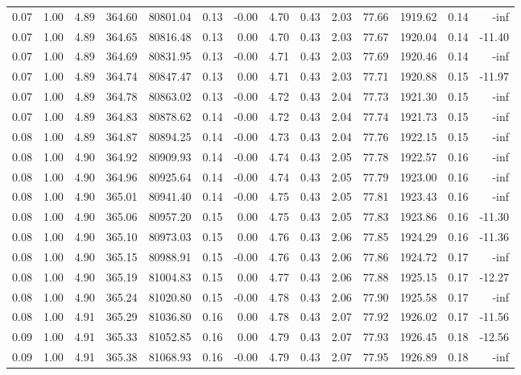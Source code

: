 \begin{table}[!ht]
\begin{tabular}{rrrrrrrrrrrrrr}
0.07 & 1.00 & 4.89 & 364.60 & 80801.04 & 0.13 & -0.00 & 4.70 & 0.43 & 2.03 & 77.66 & 1919.62 & 0.14 & -inf \\
0.07 & 1.00 & 4.89 & 364.65 & 80816.48 & 0.13 & 0.00 & 4.70 & 0.43 & 2.03 & 77.67 & 1920.04 & 0.14 & -11.40 \\
0.07 & 1.00 & 4.89 & 364.69 & 80831.95 & 0.13 & -0.00 & 4.71 & 0.43 & 2.03 & 77.69 & 1920.46 & 0.14 & -inf \\
0.07 & 1.00 & 4.89 & 364.74 & 80847.47 & 0.13 & 0.00 & 4.71 & 0.43 & 2.03 & 77.71 & 1920.88 & 0.15 & -11.97 \\
0.07 & 1.00 & 4.89 & 364.78 & 80863.02 & 0.13 & -0.00 & 4.72 & 0.43 & 2.04 & 77.73 & 1921.30 & 0.15 & -inf \\
0.07 & 1.00 & 4.89 & 364.83 & 80878.62 & 0.14 & -0.00 & 4.72 & 0.43 & 2.04 & 77.74 & 1921.73 & 0.15 & -inf \\
0.08 & 1.00 & 4.89 & 364.87 & 80894.25 & 0.14 & -0.00 & 4.73 & 0.43 & 2.04 & 77.76 & 1922.15 & 0.15 & -inf \\
0.08 & 1.00 & 4.90 & 364.92 & 80909.93 & 0.14 & -0.00 & 4.74 & 0.43 & 2.05 & 77.78 & 1922.57 & 0.16 & -inf \\
0.08 & 1.00 & 4.90 & 364.96 & 80925.64 & 0.14 & -0.00 & 4.74 & 0.43 & 2.05 & 77.79 & 1923.00 & 0.16 & -inf \\
0.08 & 1.00 & 4.90 & 365.01 & 80941.40 & 0.14 & -0.00 & 4.75 & 0.43 & 2.05 & 77.81 & 1923.43 & 0.16 & -inf \\
0.08 & 1.00 & 4.90 & 365.06 & 80957.20 & 0.15 & 0.00 & 4.75 & 0.43 & 2.05 & 77.83 & 1923.86 & 0.16 & -11.30 \\
0.08 & 1.00 & 4.90 & 365.10 & 80973.03 & 0.15 & 0.00 & 4.76 & 0.43 & 2.06 & 77.85 & 1924.29 & 0.16 & -11.36 \\
0.08 & 1.00 & 4.90 & 365.15 & 80988.91 & 0.15 & -0.00 & 4.76 & 0.43 & 2.06 & 77.86 & 1924.72 & 0.17 & -inf \\
0.08 & 1.00 & 4.90 & 365.19 & 81004.83 & 0.15 & 0.00 & 4.77 & 0.43 & 2.06 & 77.88 & 1925.15 & 0.17 & -12.27 \\
0.08 & 1.00 & 4.90 & 365.24 & 81020.80 & 0.15 & -0.00 & 4.78 & 0.43 & 2.06 & 77.90 & 1925.58 & 0.17 & -inf \\
0.08 & 1.00 & 4.91 & 365.29 & 81036.80 & 0.16 & 0.00 & 4.78 & 0.43 & 2.07 & 77.92 & 1926.02 & 0.17 & -11.56 \\
0.09 & 1.00 & 4.91 & 365.33 & 81052.85 & 0.16 & 0.00 & 4.79 & 0.43 & 2.07 & 77.93 & 1926.45 & 0.18 & -12.56 \\
0.09 & 1.00 & 4.91 & 365.38 & 81068.93 & 0.16 & -0.00 & 4.79 & 0.43 & 2.07 & 77.95 & 1926.89 & 0.18 & -inf \\

\end{tabular}
\end{table}

